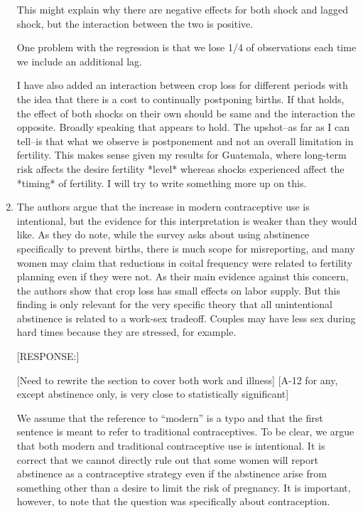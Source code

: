 \documentclass[letterpaper,12pt]{article}
\begin{document}
\begin{enumerate}
This might explain why there are negative effects for both shock
and lagged shock, but the interaction between the two is positive.

One problem with the regression is that we lose 1/4 of observations
each time we include an additional lag.




I have also added an interaction between crop loss for different periods
with the idea that there is a cost to continually postponing births. If
that holds, the effect of both shocks on their own should be same and
the interaction the opposite. Broadly speaking that appears to hold. The
upshot–as far as I can tell–is that what we observe is postponement and
not an overall limitation in fertility. This makes sense given my
results for Guatemala, where long-term risk affects the desire fertility
*level* whereas shocks experienced affect the *timing* of fertility. I
will try to write something more up on this.

\item The authors argue that the increase in modern contraceptive use is
intentional, but the evidence for this interpretation is weaker than
they would like. As they do note, while the survey asks about using
abstinence specifically to prevent births, there is much scope for
misreporting, and many women may claim that reductions in coital
frequency were related to fertility planning even if they were not. As
their main evidence against this concern, the authors show that crop
loss has small effects on labor supply. But this finding is only
relevant for the very specific theory that all unintentional abstinence
is related to a work-sex tradeoff. Couples may have less sex during hard
times because they are stressed, for example.

[RESPONSE:] 

[Need to rewrite the section to cover both work and illness]
[A-12 for any, except abstinence only, is very close to statistically significant]

We assume that the reference to ``modern'' is a typo and that the
first sentence is meant to refer to traditional contraceptives.
To be clear, we argue that both modern and traditional contraceptive
use is intentional.
It is correct that we cannot directly rule out that some women will 
report abstinence as a contraceptive strategy even if the abstinence 
arise from something other than a desire to limit the risk of pregnancy.
It is important, however, to note that the question was specifically
about contraception.


\end{enumerate}
\end{document}
